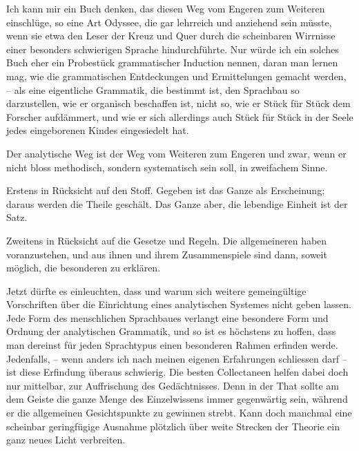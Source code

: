 Ich kann mir ein Buch denken, das diesen Weg vom Engeren zum Weiteren einschlüge, so eine Art Odyssee, die gar lehrreich und anziehend sein müsste, wenn sie etwa den Leser der Kreuz und Quer durch die scheinbaren Wirrnisse einer besonders schwierigen Sprache hindurchführte. Nur würde ich ein solches Buch eher ein Probestück grammatischer Induction nennen, daran man lernen mag, wie die grammatischen Entdeckungen und Ermittelungen gemacht werden, – als eine eigentliche Grammatik, die bestimmt ist, den Sprachbau so darzustellen, wie er organisch beschaffen ist, nicht so, wie er Stück für Stück dem Forscher aufdämmert, und wie er sich allerdings auch Stück für Stück in der Seele jedes eingeborenen Kindes eingesiedelt hat.

Der analytische Weg ist der Weg vom Weiteren zum Engeren und zwar, wenn er nicht bloss methodisch, sondern systematisch sein soll, in zweifachem Sinne.

Erstens in Rücksicht auf den Stoff. Gegeben ist das Ganze als Erscheinung; daraus werden die Theile geschält. Das Ganze aber, die lebendige Einheit ist der Satz.

\label{fp.92}

Zweitens in Rücksicht auf die Gesetze und Regeln. Die allgemeineren \label{sp.90} haben voranzustehen, und aus ihnen und ihrem Zusammenspiele sind dann, soweit möglich, die besonderen zu erklären.

Jetzt dürfte es einleuchten, dass und warum sich weitere gemeingültige Vorschriften über die Einrichtung eines analytischen Systemes nicht geben lassen. Jede Form des menschlichen Sprachbaues verlangt eine besondere Form und Ordnung der analytischen Grammatik, und so ist es höchstens zu hoffen, dass man dereinst für jeden Sprachtypus einen besonderen Rahmen erfinden werde. Jedenfalls, – wenn anders ich nach meinen eigenen Erfahrungen schliessen darf – ist diese Erfindung überaus schwierig. Die besten Collectaneen helfen dabei doch nur mittelbar, zur Auffrischung des Gedächtnisses. Denn in der That sollte am  dem Geiste die ganze Menge des Einzelwissens immer gegenwärtig sein, während er die allgemeinen Gesichtspunkte zu gewinnen strebt. Kann doch manchmal eine scheinbar geringfügige Ausnahme plötzlich über weite Strecken der Theorie ein ganz neues Licht verbreiten.

